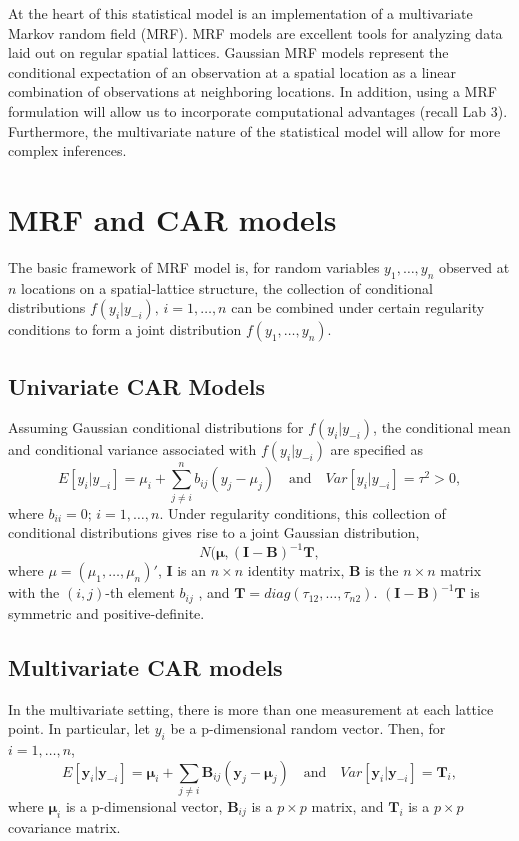 \documentclass[12pt]{amsart}
\begin{document}
At the heart of this statistical model is an implementation of a multivariate Markov random field (MRF). MRF models are excellent tools for analyzing data laid out on regular spatial lattices. Gaussian MRF models represent the conditional expectation of an observation at a spatial location as a linear combination of observations at neighboring locations. In addition, using a MRF formulation will allow us to incorporate computational advantages (recall Lab 3). Furthermore, the multivariate nature of the statistical model will allow for more complex inferences.

\section{MRF and CAR models}

The basic framework of MRF model is, for random variables $y_1 , \dots, y_n$ observed at $n$ locations on a spatial-lattice structure, the collection of conditional distributions $f(y_i |y_{-i}), \, i = 1, \dots, n$ can be combined under certain regularity conditions to form a joint distribution $f (y_1, \dots, y_n)$.

\subsection{Univariate CAR Models}

Assuming Gaussian conditional distributions for $f (y_i |y_{-i})$, the conditional mean and conditional variance associated with $f (y_i |y_{-i})$ are specified as
$$E[y_i | y_{-i}] = \mu_i + \sum_{j\neq i}^n b_{ij} (y_j-\mu_j) \quad \text{and} \quad Var[y_i |y_{-i}] = \tau^2 > 0,$$
where $b_{ii} = 0; \, i = 1, \dots, n$. Under regularity conditions, this collection of conditional distributions gives rise to a joint Gaussian distribution,
$$N(\boldsymbol{\mu}, (\boldsymbol{I}-\boldsymbol{B})^{-1}\boldsymbol{T},$$
where $\mu=(\mu_1,\dots,\mu_n)'$, $\boldsymbol{I}$ is an $n\times n$ identity matrix, $\boldsymbol{B}$ is the $n\times n$ matrix with the $(i, j )$-th element $b_{ij}$ , and $\boldsymbol{T} = diag(\tau_{12}, \dots, \tau_{n2})$. $(\boldsymbol{I}-\boldsymbol{B})^{-1}\boldsymbol{T}$ is symmetric and positive-definite.

\subsection{Multivariate CAR models}

In the multivariate setting, there is more than one measurement at each lattice point. In particular, let $y_i$ be a p-dimensional random vector. Then, for $i = 1, \dots, n$,
$$E[\boldsymbol{y}_i | \boldsymbol{y}_{-i}] = \boldsymbol{\mu}_i + \sum_{j\neq i} \boldsymbol{B}_{ij} (\boldsymbol{y}_j-\boldsymbol{\mu}_j) \quad \text{and} \quad Var[\boldsymbol{y}_i |\boldsymbol{y}_{-i}] = \boldsymbol{T}_i,$$
where $\boldsymbol{\mu}_i$ is a p-dimensional vector, $\boldsymbol{B}_{ij}$ is a $p\times p$ matrix, and $\boldsymbol{T}_i$ is a $p\times p$ covariance matrix. 
\end{document}
